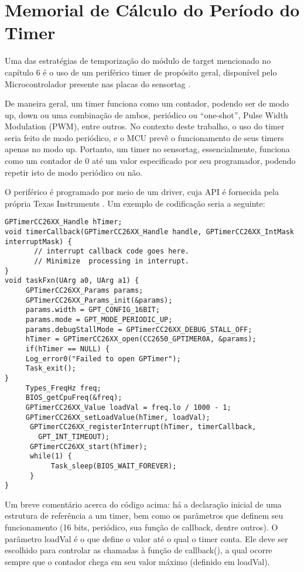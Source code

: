 \chapter{Memorial de Cálculo do Período do Timer}

Uma das estratégias de temporização do módulo de target mencionado no capítulo 6 é o uso de um periférico timer de propósito geral, disponível pelo Microcontrolador presente nas placas do sensortag \cite{datasheet}.

De maneira geral, um timer funciona como um contador, podendo ser de modo up, down ou uma combinação de ambos, periódico ou “one-shot”, Pulse Width Modulation (PWM), entre outros. No contexto deste trabalho, o uso do timer seria feito de modo periódico, e o MCU prevê o funcionamento de seus timers apenas no modo up. Portanto, um timer no sensortag, essencialmente, funciona como um contador de 0 até um valor especificado por seu programador, podendo repetir isto de modo periódico ou não.

O periférico é programado por meio de um driver, cuja API é fornecida pela própria Texas Instruments \cite{shibata}. Um exemplo de codificação seria a seguinte:

\begin{lstlisting}
GPTimerCC26XX_Handle hTimer;
void timerCallback(GPTimerCC26XX_Handle handle, GPTimerCC26XX_IntMask interruptMask) {
       // interrupt callback code goes here.
       // Minimize  processing in interrupt.
}
void taskFxn(UArg a0, UArg a1) {
     GPTimerCC26XX_Params params;
     GPTimerCC26XX_Params_init(&params);
     params.width = GPT_CONFIG_16BIT;
     params.mode = GPT_MODE_PERIODIC_UP;
     params.debugStallMode = GPTimerCC26XX_DEBUG_STALL_OFF;
     hTimer = GPTimerCC26XX_open(CC2650_GPTIMER0A, &params);
     if(hTimer == NULL) {
     Log_error0("Failed to open GPTimer");
     Task_exit();
}
     Types_FreqHz freq;
     BIOS_getCpuFreq(&freq);
     GPTimerCC26XX_Value loadVal = freq.lo / 1000 - 1;
     GPTimerCC26XX_setLoadValue(hTimer, loadVal);
      GPTimerCC26XX_registerInterrupt(hTimer, timerCallback,
        GPT_INT_TIMEOUT);
      GPTimerCC26XX_start(hTimer);
      while(1) {
           Task_sleep(BIOS_WAIT_FOREVER);
      }
}
\end{lstlisting}

Um breve comentário acerca do código acima: há a declaração inicial de uma estrutura de referência a um timer, bem como os parâmetros que definem seu funcionamento (16 bits, periódico, sua função de callback, dentre outros). O parâmetro loadVal é o que define o valor até o qual o timer conta. Ele deve ser escolhido para controlar as chamadas à função de callback(), a qual ocorre sempre que o contador chega em seu valor máximo (definido em loadVal).

